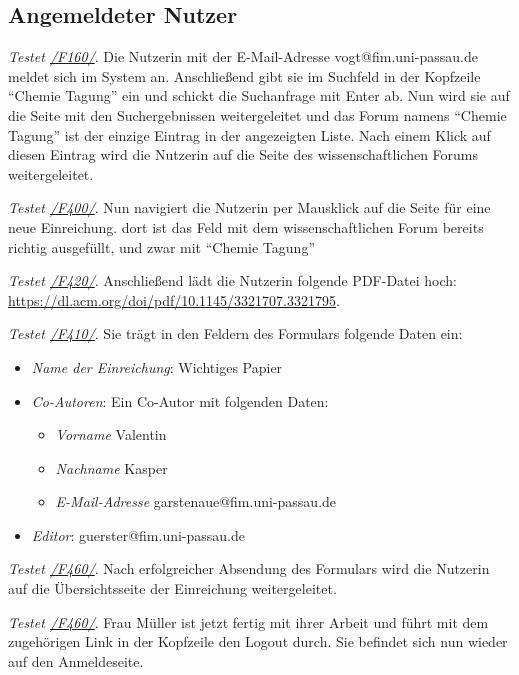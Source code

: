 \subsection{Angemeldeter Nutzer}
\begin{description}

	 \emph{Testet \hyperref[funkt:160]{/F160/}}.
	Die Nutzerin mit der E-Mail-Adresse vogt@fim.uni-passau.de meldet sich im System an.
	Anschließend gibt sie im Suchfeld in der Kopfzeile ``Chemie Tagung'' ein und schickt die Suchanfrage mit Enter ab.
	Nun wird sie auf die Seite mit den Suchergebnissen weitergeleitet und das Forum namens ``Chemie Tagung'' ist der einzige Eintrag in der angezeigten Liste.
	Nach einem Klick auf diesen Eintrag wird die Nutzerin auf die Seite des wissenschaftlichen Forums weitergeleitet.

	 \emph{Testet \hyperref[funkt:400]{/F400/}}.
	Nun navigiert die Nutzerin per Mausklick auf die Seite für eine neue Einreichung.
	dort ist das Feld mit dem wissenschaftlichen Forum bereits richtig ausgefüllt, und zwar mit ``Chemie Tagung''

	 \emph{Testet \hyperref[funkt:420]{/F420/}}.
	Anschließend lädt die Nutzerin folgende PDF-Datei hoch: \href{https://dl.acm.org/doi/pdf/10.1145/3321707.3321795}{https://dl.acm.org/doi/pdf/10.1145/3321707.3321795}.

	 \emph{Testet \hyperref[funkt:410]{/F410/}}.
	Sie trägt in den Feldern des Formulars folgende Daten ein:
	\begin{itemize}
		\item \emph{Name der Einreichung}: Wichtiges Papier
		\item \emph{Co-Autoren}: Ein Co-Autor mit folgenden Daten:
		\begin{itemize}
			\item \emph{Vorname} Valentin
			\item \emph{Nachname} Kasper
			\item \emph{E-Mail-Adresse} garstenaue@fim.uni-passau.de
		\end{itemize}
		\item \emph{Editor}: guerster@fim.uni-passau.de
	\end{itemize}


	 \emph{Testet \hyperref[funkt:460]{/F460/}}.
	Nach erfolgreicher Absendung des Formulars wird die Nutzerin auf die Übersichtsseite der Einreichung weitergeleitet.

	 \emph{Testet \hyperref[funkt:460]{/F460/}}.
	Frau Müller ist jetzt fertig mit ihrer Arbeit und führt mit dem zugehörigen Link in der Kopfzeile den Logout durch.
	Sie befindet sich nun wieder auf den Anmeldeseite.
\end{description}

